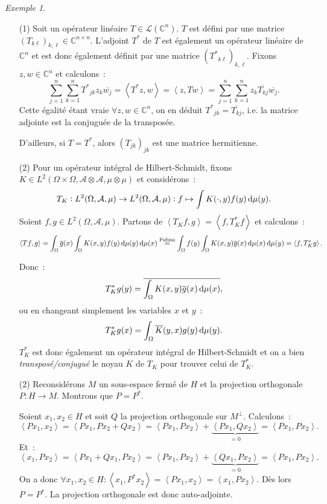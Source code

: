 \documentclass{report}
\newcommand{\C}{{\mathbb C}}
\newcommand{\scpr}[2]{\left\langle#1, #2\right\rangle}
\theoremstyle{definition}
\theoremstyle{remark}
\newtheorem{ex}{Exemple}[chapter]
\begin{document}
\begin{ex}~
\begin{itemize}
	\item[(1)] Soit un opérateur linéaire $T \in \mathcal L(\C^n)$. $T$ est défini par une matrice $(T_{k\ell})_{k,\ell} \in \C^{n \times n}$. L'adjoint $T^*$ de $T$
	est également un opérateur linéaire de $\C^n$ et est donc également définit par une matrice $({T^*}_{k\ell})_{k,\ell}$. Fixons $z, w \in \C^n$ et calculons~:
	\[\sum_{j=1}^n\sum_{k=1}^n{T^*}_{jk}z_k\overline {w_j} = \scpr {T^*z}w = \scpr z{Tw} = \sum_{j=1}^n\sum_{k=1}^nz_k\overline {T_{kj}}\overline {w_j}.\]
	Cette égalité étant vraie $\forall z, w \in \C^n$, on en déduit ${T^*}_{jk} = \overline {T_{kj}}$, i.e. la matrice adjointe est la conjuguée de la transposée.

	D'ailleurs, si $T=T^*$, alors $(T_{jk})_{jk}$ est une matrice hermitienne.
	\item[(2)] Pour un opérateur intégral de Hilbert-Schmidt, fixons $K \in L^2(\Omega \times \Omega, \mathcal A \otimes \mathcal A, \mu \otimes \mu)$ et considérons~:
	\[T_K : L^2(\Omega, \mathcal A, \mu) \to L^2(\Omega, \mathcal A, \mu) : f \mapsto \int K(\cdot, y)f(y)\dif\mu(y).\]
	Soient $f, g \in L^2(\Omega, \mathcal A, \mu)$. Partons de $\scpr {T_Kf}g = \scpr f{T_K^*f}$ et calculons~:
	\[\scpr {Tf}g = \int_\Omega\overline g(x)\int_\Omega K(x, y)f(y)\dif\mu(y)\dif\mu(x) \stackrel {\text{Fubini}}=
		\int_\Omega f(y)\int_\Omega K(x, y)\overline g(x)\dif\mu(x)\dif\mu(y) = \scpr f{T_K^*g}.\]

	Donc~:
	\[T_K^*g(y) = \overline {\int_\Omega K(x, y)\overline g(x)\dif\mu(x)},\]
	ou en changeant simplement les variables $x$ et $y$~:
	\[T_K^*g(x) = \int_\Omega \overline K(y, x) g(y)\dif\mu(y).\]
	$T_K^*$ est donc également un opérateur intégral de Hilbert-Schmidt et on a bien \textit{transposé/conjugué} le noyau $K$ de $T_K$ pour trouver celui de $T_K^*$.

	\item[(2)] Reconsidérons $M$ un sous-espace fermé de $H$ et la projection orthogonale $P : H \to M$. Montrons que $P = P^*$.

	Soient $x_1, x_2 \in H$ et soit $Q$ la projection orthogonale sur $M^\perp$. Calculons~:
	\[\scpr {Px_1}{x_2} = \scpr {Px_1}{Px_2 + Qx_2} = \scpr {Px_1}{Px_2} + \underbrace {\scpr {Px_1}{Qx_2}}_{= 0} = \scpr {Px_1}{Px_2}.\]
	Et~:
	\[\scpr {x_1}{Px_2} = \scpr {Px_1 + Qx_1}{Px_2} = \scpr {Px_1}{Px_2} + \underbrace {\scpr {Qx_1}{Px_2}}_{= 0} = \scpr {Px_1}{Px_2}.\]
	On a donc $\forall x_1, x_2 \in H : \scpr {x_1}{P^*x_2} = \scpr {Px_1}{x_2} = \scpr {x_1}{Px_2}$. Dès lors $P = P^*$. La projection orthogonale est donc auto-adjointe.
\end{itemize}
\end{ex}
\end{document}
